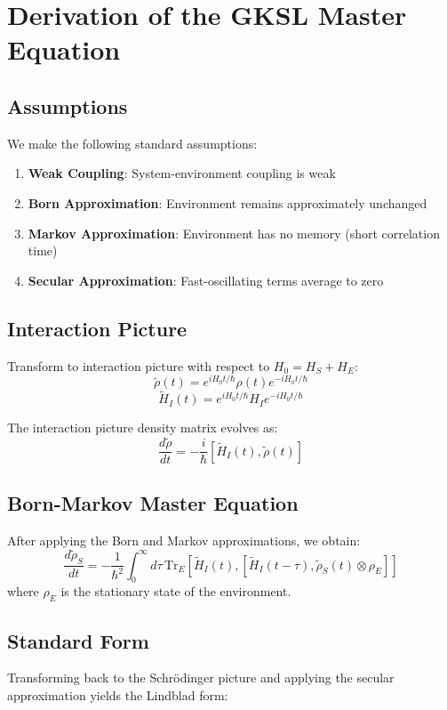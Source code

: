 \documentclass[12pt]{article}
\begin{document}
\section{Derivation of the GKSL Master Equation}

\subsection{Assumptions}
We make the following standard assumptions:
\begin{enumerate}
    \item \textbf{Weak Coupling}: System-environment coupling is weak
    \item \textbf{Born Approximation}: Environment remains approximately unchanged
    \item \textbf{Markov Approximation}: Environment has no memory (short correlation time)
    \item \textbf{Secular Approximation}: Fast-oscillating terms average to zero
\end{enumerate}

\subsection{Interaction Picture}
Transform to interaction picture with respect to $H_0 = H_S + H_E$:
\[
\tilde{\rho}(t) = e^{iH_0 t/\hbar} \rho(t) e^{-iH_0 t/\hbar}
\]
\[
\tilde{H}_I(t) = e^{iH_0 t/\hbar} H_I e^{-iH_0 t/\hbar}
\]

The interaction picture density matrix evolves as:
\[
\frac{d\tilde{\rho}}{dt} = -\frac{i}{\hbar}[\tilde{H}_I(t), \tilde{\rho}(t)]
\]

\subsection{Born-Markov Master Equation}
After applying the Born and Markov approximations, we obtain:
\[
\frac{d\tilde{\rho}_S}{dt} = -\frac{1}{\hbar^2} \int_0^\infty d\tau \, \text{Tr}_E\left[\tilde{H}_I(t), [\tilde{H}_I(t-\tau), \tilde{\rho}_S(t) \otimes \rho_E]\right]
\]
where $\rho_E$ is the stationary state of the environment.

\subsection{Standard Form}
Transforming back to the Schrödinger picture and applying the secular approximation yields the Lindblad form:
\end{document}
